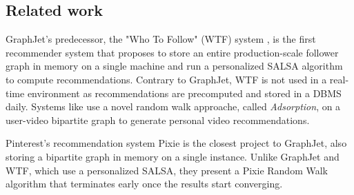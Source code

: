 \subsection{Related work}
\label{subsec:graphjet-related-work}
GraphJet's predecessor, the "Who To Follow" (WTF) system \cite{goelWhoToFollowSystemTwitter2015, guptaWTFWhoFollow}, is the first recommender system that proposes to store an entire production-scale follower graph in memory on a single machine and run a personalized SALSA algorithm to compute recommendations. Contrary to GraphJet, WTF is not used in a real-time environment as recommendations are precomputed and stored in a DBMS daily. Systems like \cite{balujaVideoSuggestionDiscovery2008} use a novel random walk approache, called \emph{Adsorption}, on a user-video bipartite graph to generate personal video recommendations.


Pinterest's recommendation system Pixie \cite{eksombatchaiPixieSystemRecommending2018} is the closest project to GraphJet, also storing a bipartite graph in memory on a single instance. Unlike GraphJet and WTF, which use a personalized SALSA, they present a Pixie Random Walk algorithm that terminates early once the results start converging.
